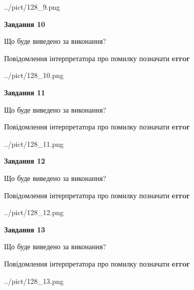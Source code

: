 \documentclass[11pt, ukrainian]{article}
\begin{document}
{\begin {large}
\begin{center}
	{../pict/128_9.png}
\end{center}
\newpage

{\begin {center}\textbf{Завдання 10}\end {center}}\par
Що буде виведено за виконання? \par
Повідомлення інтерпретатора про помилку позначати \textbf{error}

\begin{center}
	{../pict/128_10.png}
\end{center}
\newpage

{\begin {center}\textbf{Завдання 11}\end {center}}\par
Що буде виведено за виконання? \par
Повідомлення інтерпретатора про помилку позначати \textbf{error}

\begin{center}
	{../pict/128_11.png}
\end{center}
\newpage

{\begin {center}\textbf{Завдання 12}\end {center}}\par
Що буде виведено за виконання? \par
Повідомлення інтерпретатора про помилку позначати \textbf{error}

\begin{center}
	{../pict/128_12.png}
\end{center}
\newpage

{\begin {center}\textbf{Завдання 13}\end {center}}\par
Що буде виведено за виконання? \par
Повідомлення інтерпретатора про помилку позначати \textbf{error}

\begin{center}
	{../pict/128_13.png}
\end{center}
\newpage


\end{large}}
\end{document}
